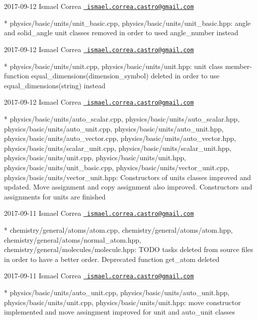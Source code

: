  2017-\/09-\/12 Ismael Correa \href{mailto:ismael.correa.castro@gmail.com}{\texttt{ ismael.\+correa.\+castro@gmail.\+com}} \begin{DoxyVerb}* physics/basic/units/unit_basic.cpp,
physics/basic/units/unit_basic.hpp: angle and solid_angle unit
classes removed in order to used angle_number instead
\end{DoxyVerb}
 2017-\/09-\/12 Ismael Correa \href{mailto:ismael.correa.castro@gmail.com}{\texttt{ ismael.\+correa.\+castro@gmail.\+com}} \begin{DoxyVerb}* physics/basic/units/unit.cpp, physics/basic/units/unit.hpp: unit
class member-function equal_dimensions(dimension_symbol) deleted in
order to use equal_dimensions(string) instead
\end{DoxyVerb}
 2017-\/09-\/12 Ismael Correa \href{mailto:ismael.correa.castro@gmail.com}{\texttt{ ismael.\+correa.\+castro@gmail.\+com}} \begin{DoxyVerb}* physics/basic/units/auto_scalar.cpp,
physics/basic/units/auto_scalar.hpp,
physics/basic/units/auto_unit.cpp,
physics/basic/units/auto_unit.hpp,
physics/basic/units/auto_vector.cpp,
physics/basic/units/auto_vector.hpp,
physics/basic/units/scalar_unit.cpp,
physics/basic/units/scalar_unit.hpp, physics/basic/units/unit.cpp,
physics/basic/units/unit.hpp, physics/basic/units/unit_basic.cpp,
physics/basic/units/vector_unit.cpp,
physics/basic/units/vector_unit.hpp: Constructors of units classes
improved and updated. Move assignment and copy assignment also
improved. Constructors and assignments for units are finished
\end{DoxyVerb}
 2017-\/09-\/11 Ismael Correa \href{mailto:ismael.correa.castro@gmail.com}{\texttt{ ismael.\+correa.\+castro@gmail.\+com}} \begin{DoxyVerb}* chemistry/general/atoms/atom.cpp,
chemistry/general/atoms/atom.hpp,
chemistry/general/atoms/normal_atom.hpp,
chemistry/general/molecules/molecule.hpp: TODO tasks deleted from
source files in order to have a better order. Deprecated function
get_atom deleted
\end{DoxyVerb}
 2017-\/09-\/11 Ismael Correa \href{mailto:ismael.correa.castro@gmail.com}{\texttt{ ismael.\+correa.\+castro@gmail.\+com}} \begin{DoxyVerb}* physics/basic/units/auto_unit.cpp,
physics/basic/units/auto_unit.hpp, physics/basic/units/unit.cpp,
physics/basic/units/unit.hpp: move constructor implemented and move
assingment improved for unit and auto_unit classes
\end{DoxyVerb}
